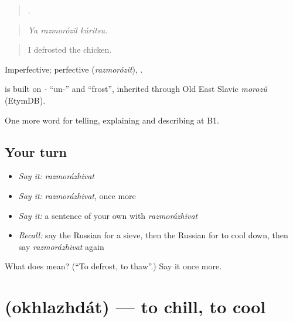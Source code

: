 \begin{quote}
  .
\end{quote}

\begin{quote}
\emph{Ya razmorózil kúritsu.}
\end{quote}

\begin{quote}
I defrosted the chicken.
\end{quote}

Imperfective; perfective \emph{} (\emph{razmorózit}), \emph{}.

\begin{cousinweb}
\emph{} is built on \emph{-} \textquotedblleft{}un-\textquotedblright{} and \emph{} \textquotedblleft{}frost\textquotedblright{}, inherited through Old East Slavic \emph{morozŭ} (EtymDB).
\end{cousinweb}

\begin{grammarlens}[title={What you've built}]
One more word for telling, explaining and describing at B1.
\end{grammarlens}

\subsection*{Your turn}
\begin{itemize}
\raggedright
  \item \emph{Say it:} \emph{razmorázhivat}
  \item \emph{Say it:} \emph{razmorázhivat}, once more
  \item \emph{Say it:} a sentence of your own with \emph{razmorázhivat}
  \item \emph{Recall:} say the Russian for a sieve, then the Russian for to cool down, then say \emph{razmorázhivat} again
\end{itemize}

\begin{tcolorbox}[breakable,colback=teal!4,colframe=teal!35!black,title={Before you move on}]
What does  mean? (\textquotedblleft{}To defrost, to thaw\textquotedblright{}.) Say it once more.
\end{tcolorbox}
\section[\texorpdfstring{\ru{охлаждать} (okhlazhdát)}{охлаждать (okhlazhdát)}]{ (okhlazhdát) — to chill, to cool}

